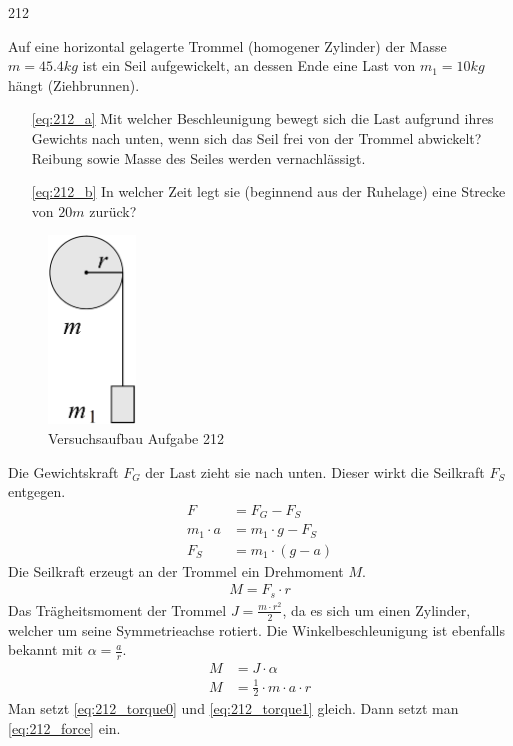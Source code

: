\begin{auf}
    212
\end{auf}
Auf eine horizontal gelagerte Trommel (homogener Zylinder) der Masse $m=45.4kg$ ist ein Seil aufgewickelt, an dessen Ende eine Last von $m_1=10kg$ hängt (Ziehbrunnen).
\begin{enumerate}
    \item[\ref{eq:212_a}] Mit welcher Beschleunigung bewegt sich die Last aufgrund ihres Gewichts nach unten, wenn sich das Seil frei von der Trommel abwickelt? Reibung sowie Masse des Seiles werden vernachlässigt.
    \item[\ref{eq:212_b}] In welcher Zeit legt sie (beginnend aus der Ruhelage) eine Strecke von $20m$ zurück?
\end{enumerate}
\begin{figure}[h]
    \centering
    \includegraphics[height=5cm]{images/212_0.png}
    \caption{Versuchsaufbau Aufgabe 212}
\end{figure}
Die Gewichtskraft $F_G$ der Last zieht sie nach unten. Dieser wirkt die Seilkraft $F_S$ entgegen.
\begin{align}
    F&=F_G-F_S				\nonumber\\
    m_1\cdot a&=m_1\cdot g-F_S	\nonumber\\
    F_S&=m_1\cdot(g-a)	\label{eq:212_force}
\end{align}
Die Seilkraft erzeugt an der Trommel ein Drehmoment $M$.
\begin{align}
    M=F_s\cdot r	\label{eq:212_torque0}
\end{align}
Das Trägheitsmoment der Trommel $J=\frac{m\cdot r^2}{2}$, da es sich um einen Zylinder, welcher um seine Symmetrieachse rotiert. Die Winkelbeschleunigung ist ebenfalls bekannt mit $\alpha=\frac{a}{r}$.
\begin{align}
    M&=J\cdot\alpha	\nonumber\\
    M&=\frac{1}{2}\cdot m\cdot a\cdot r	\label{eq:212_torque1}
\end{align}
Man setzt \eqref{eq:212_torque0} und \eqref{eq:212_torque1} gleich. Dann setzt man \eqref{eq:212_force} ein.
